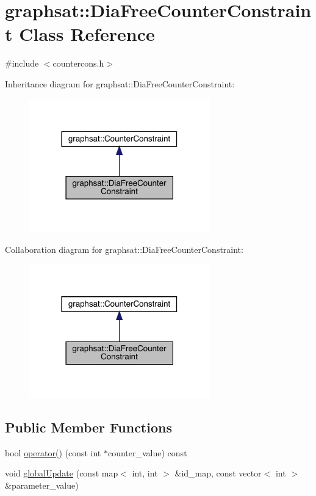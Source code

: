 \hypertarget{classgraphsat_1_1_dia_free_counter_constraint}{}\section{graphsat\+::Dia\+Free\+Counter\+Constraint Class Reference}
\label{classgraphsat_1_1_dia_free_counter_constraint}


{\ttfamily \#include $<$countercons.\+h$>$}



Inheritance diagram for graphsat\+::Dia\+Free\+Counter\+Constraint\+:\nopagebreak
\begin{figure}[H]
\begin{center}
\leavevmode
\includegraphics[width=222pt]{classgraphsat_1_1_dia_free_counter_constraint__inherit__graph}
\end{center}
\end{figure}


Collaboration diagram for graphsat\+::Dia\+Free\+Counter\+Constraint\+:\nopagebreak
\begin{figure}[H]
\begin{center}
\leavevmode
\includegraphics[width=222pt]{classgraphsat_1_1_dia_free_counter_constraint__coll__graph}
\end{center}
\end{figure}
\subsection*{Public Member Functions}
\begin{DoxyCompactItemize}
\item 
bool \mbox{\hyperlink{classgraphsat_1_1_dia_free_counter_constraint_acb4e5015384b5011ca5347c229b6bb56}{operator()}} (const int $\ast$counter\+\_\+value) const
\item 
void \mbox{\hyperlink{classgraphsat_1_1_dia_free_counter_constraint_a64d4ec6cb17f6543320bf58ae2b6de01}{global\+Update}} (const map$<$ int, int $>$ \&id\+\_\+map, const vector$<$ int $>$ \&parameter\+\_\+value)
\end{DoxyCompactItemize}

